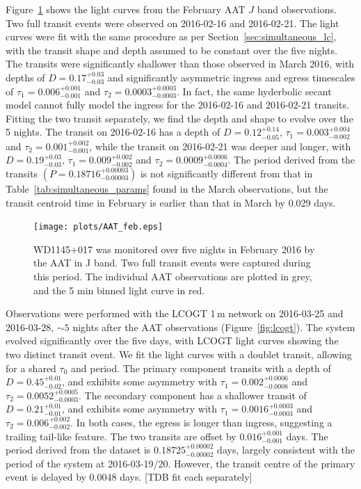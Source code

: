\documentclass[iop,useAMES,usenatbig]{emulateapj}
\begin{document}
Figure~\ref{fig:lc_201602} shows the light curves from the February AAT $J$ band observations. Two full transit events were observed on 2016-02-16 and 2016-02-21. The light curves were fit with the same procedure as per Section~\ref{sec:simultaneous_lc}, with the transit shape and depth assumed to be constant over the five nights. The transits were significantly shallower than those observed in March 2016, with depths of $D=0.17_{-0.03}^{+0.03}$ and significantly asymmetric ingress and egress timescales of $\tau_1 = 0.006_{-0.001}^{+0.001}$ and $\tau_2 = 0.0003_{-0.0003}^{+0.0003}$. In fact, the same hyderbolic secant model cannot fully model the ingress for the 2016-02-16 and 2016-02-21 transits. Fitting the two transit separately, we find the depth and shape to evolve over the 5 nights. The transit on 2016-02-16 has a depth of $D = 0.12_{-0.05}^{+0.14}$, $\tau_1 = 0.003_{-0.002}^{+0.004}$ and $\tau_2 = 0.001_{-0.001}^{+0.002}$, while the transit on 2016-02-21 was deeper and longer, with $D = 0.19_{-0.03}^{+0.03}$, $\tau_1 = 0.009_{-0.002}^{+0.002}$ and $\tau_2 = 0.0009_{-0.0004}^{+0.0006}$. The period derived from the transits $(P=0.18716_{-0.00003}^{+0.00003})$ is not significantly different from that in Table~\ref{tab:simultaneous_params} found in the March observations, but the transit centroid time in February is earlier than that in March by 0.029 days. 

\begin{figure}
    \centering
    \texttt{[image: plots/AAT\_feb.eps]}
    \caption{WD1145+017 was monitored over five nights in February 2016 by the AAT in J band. Two full transit events were captured during this period. The individual AAT observations are plotted in grey, and the 5 min binned light curve in red.}
    \label{fig:lc_201602}
\end{figure}

Observations were performed with the LCOGT 1\,m network on 2016-03-25 and 2016-03-28, $\sim 5$ nights after the AAT observations (Figure~\ref{fig:lcogt}). The system evolved significantly over the five days, with LCOGT light curves showing the two distinct transit event. We fit the light curves with a doublet transit, allowing for a shared $\tau_0$ and period. The primary component transits with a depth of $D = 0.45_{-0.02}^{+0.01}$, and exhibits some asymmetry with $\tau_1 = 0.002_{-0.0008}^{+0.0006}$ and $\tau_2 = 0.0052_{-0.0003}^{+0.0005}$. The secondary component has a shallower transit of $D = 0.21_{-0.01}^{+0.01}$, and exhibits some asymmetry with $\tau_1 = 0.0016_{-0.0003}^{+0.0003}$ and $\tau_2 = 0.006_{-0.002}^{+0.002}$. In both cases, the egress is longer than ingress, suggesting a trailing tail-like feature. The two transits are offset by $0.016_{-0.001}^{+0.001}$ days. The period derived from the dataset is $0.18725_{-0.00002}^{+0.00002}$ days, largely consistent with the period of the system at 2016-03-19/20. However, the transit centre of the primary event is delayed by 0.0048 days.  [TDB fit each separately]
\end{document}
